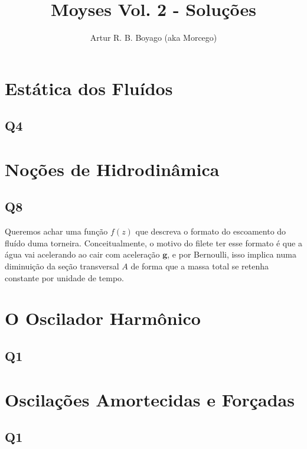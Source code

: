 \documentclass{antiquebook}
\author{Artur R. B. Boyago (aka Morcego)}
\title{{Moyses Vol. 2 - Soluções}}
\begin{document}
	\frontmatter
	\maketitle

	\tableofcontents

	\mainmatter
	\pagestyle{fancy}

	\chapter{Estática dos Fluídos}

	\section{Q4}

	\chapter{Noções de Hidrodinâmica}

	\section{Q8}

	Queremos achar uma função $f(z)$ que descreva o formato do escoamento do fluído 
	duma torneira. Conceitualmente, o motivo do filete ter esse formato é que a água
	vai acelerando ao cair com aceleração $\mathbf{g}$, e por Bernoulli, isso implica 
	numa diminuição da seção transversal $A$ de forma que a massa total se retenha
	constante por unidade de tempo.

	\vspace{\baselineskip}

	\chapter{O Oscilador Harmônico}

	\section{Q1}

	\chapter{Oscilações Amortecidas e Forçadas}

	\section{Q1}
\end{document}
